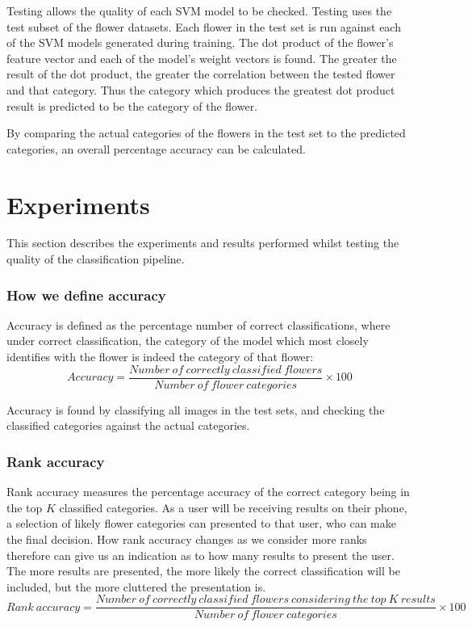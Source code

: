 \documentclass[11pt, a4paper]{report}
\begin{document}
Testing allows the quality of each SVM model to be checked. Testing uses the test subset of the flower datasets. Each flower in the test set is run against each of the SVM models generated during training. The dot product of the  flower's feature vector and each of the model's weight vectors is found. The greater the result of the dot product, the greater the correlation between the tested flower and that category. Thus the category which produces the greatest dot product result is predicted to be the category of the flower.

By comparing the actual categories of the flowers in the test set to the predicted categories, an overall percentage accuracy can be calculated.


\section{Experiments}

This section describes the experiments and results performed whilst testing the quality of the classification pipeline. 

\subsubsection{How we define accuracy}

Accuracy is defined as the percentage number of correct classifications, where under correct classification, the category of the model which most closely identifies with the flower is indeed the category of that flower:
$$
Accuracy = \frac{Number\ of\ correctly\ classified\ flowers}{Number\ of\ flower\ categories}
\times 100
$$

Accuracy is found by classifying all images in the test sets, and checking the classified categories against the actual categories. 

\subsubsection{Rank accuracy}

Rank accuracy measures the percentage accuracy of the correct category being in the top $K$ classified categories. As a user will be receiving results on their phone, a selection of likely flower categories can presented to that user, who can make the final decision. How rank accuracy changes as we consider more ranks therefore can give us an indication as to how many results to present the user. The more results are presented, the more likely the correct classification will be included, but the more cluttered the presentation is.
$$
Rank\ accuracy = \frac{Number\ of\ correctly\ classified\ flowers\ considering\ the\ top\ K\ results}{Number\ of\ flower\ categories}
\times 100
$$
\end{document}
